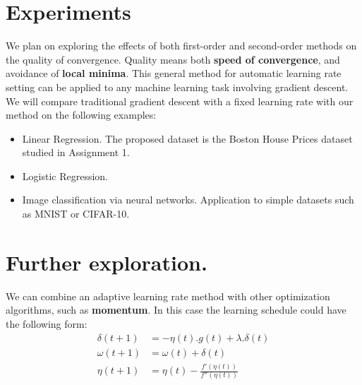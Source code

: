 \documentclass[]{article}
\begin{document}
\section{Experiments}
We plan on exploring the effects of both first-order and second-order methods on the quality of convergence. Quality means both \textbf{speed of convergence}, and avoidance of \textbf{local minima}. This general method for automatic learning rate setting can be applied to any machine learning task involving gradient descent. We will compare traditional gradient descent with a fixed learning rate with our method on the following examples:\\
\begin{itemize}
\item Linear Regression. The proposed dataset is the Boston House Prices dataset studied in Assignment 1.
\item Logistic Regression. 
\item Image classification via neural networks. Application to simple datasets such as MNIST or CIFAR-10. 	
\end{itemize}

\section{Further exploration.}
We can combine an adaptive learning rate method with other optimization algorithms, such as \textbf{momentum}. In this case the learning schedule could have the following form:\\
\begin{align}
\delta(t+1) &= -\eta(t).g(t) + \lambda.\delta(t)\\
\omega(t+1) &= \omega(t) + \delta(t)\\
\eta(t+1) &= \eta(t) - \frac{f'(\eta(t))}{f''(\eta(t))} 
\end{align}
\end{document}
